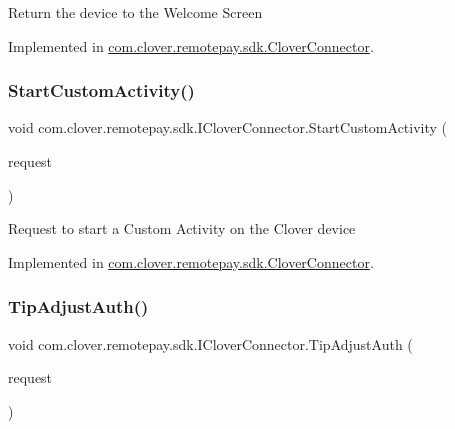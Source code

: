 Return the device to the Welcome Screen 



Implemented in \hyperlink{classcom_1_1clover_1_1remotepay_1_1sdk_1_1_clover_connector_a33c344737b54ed6d8c910e2ac1e5bd49}{com.\+clover.\+remotepay.\+sdk.\+Clover\+Connector}.

\mbox{\label{interfacecom_1_1clover_1_1remotepay_1_1sdk_1_1_i_clover_connector_a3ec58f5860c34bcb104578caddb0b564}} 
\subsubsection{\texorpdfstring{Start\+Custom\+Activity()}{StartCustomActivity()}}
{\footnotesize\ttfamily void com.\+clover.\+remotepay.\+sdk.\+I\+Clover\+Connector.\+Start\+Custom\+Activity (\begin{DoxyParamCaption}\item[{\hyperlink{classcom_1_1clover_1_1remotepay_1_1sdk_1_1_custom_activity_request}{Custom\+Activity\+Request}}]{request }\end{DoxyParamCaption})}



Request to start a Custom Activity on the Clover device 



Implemented in \hyperlink{classcom_1_1clover_1_1remotepay_1_1sdk_1_1_clover_connector_a7c4a08c49e7285e95d7e36340ebe3306}{com.\+clover.\+remotepay.\+sdk.\+Clover\+Connector}.

\mbox{\label{interfacecom_1_1clover_1_1remotepay_1_1sdk_1_1_i_clover_connector_a815c8be2012ebda06247c059771717cc}} 
\subsubsection{\texorpdfstring{Tip\+Adjust\+Auth()}{TipAdjustAuth()}}
{\footnotesize\ttfamily void com.\+clover.\+remotepay.\+sdk.\+I\+Clover\+Connector.\+Tip\+Adjust\+Auth (\begin{DoxyParamCaption}\item[{\hyperlink{classcom_1_1clover_1_1remotepay_1_1sdk_1_1_tip_adjust_auth_request}{Tip\+Adjust\+Auth\+Request}}]{request }\end{DoxyParamCaption})}



